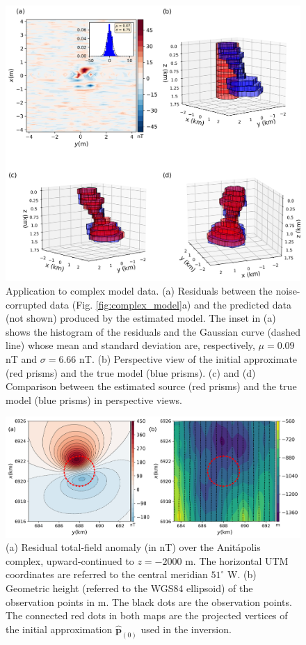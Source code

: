 \begin{figure}
    \centering
    \includegraphics[width=\linewidth]{figures/complex_results.png}
    \caption{Application to complex model data. (a) Residuals between the noise-corrupted data (Fig. \ref{fig:complex_model}a) and the predicted data (not shown) produced by the estimated model. The inset in (a) shows the histogram of the residuals and the Gaussian curve (dashed line) whose mean and standard deviation are, respectively, $\mu = 0.09$ nT and $\sigma=6.66$ nT. (b) Perspective view of the initial approximate (red prisms) and the true model (blue prisms). (c) and (d) Comparison between the estimated source (red prisms) and the true model (blue prisms) in perspective views. 
}
    \label{fig:complex_result}
\end{figure}


\begin{figure}
    \centering
    \includegraphics[width=\linewidth]{figures/real_updata.png}
    \caption{(a) Residual total-field anomaly (in nT) over the  
    Anit{\'a}polis complex, upward-continued to $z = -2000$ m. The horizontal UTM 
    coordinates are referred to the central meridian $ 51^\circ $ W. (b) Geometric 
    height (referred to the WGS84 ellipsoid) of the observation points in m. 
    The black dots are the observation points. The connected red dots in both maps 
    are the projected vertices of the initial approximation $\hat{\mathbf{p}}_{(0)}$ 
    used in the inversion.}
    \label{fig:real_data}
\end{figure}

